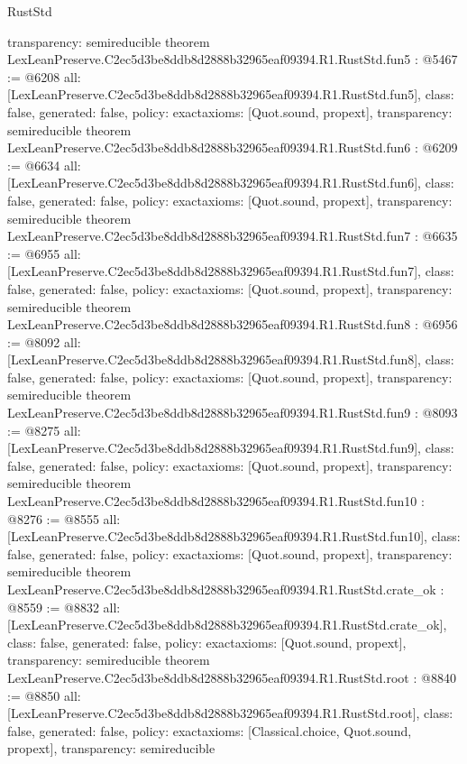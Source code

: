 \begin{lexlean}{RustStd}
\begin{coremodule}
{  transparency: semireducible
}
theorem LexLeanPreserve.C2ec5d3be8ddb8d2888b32965eaf09394.R1.RustStd.fun5 : @5467 := @6208 {
  all: [LexLeanPreserve.C2ec5d3be8ddb8d2888b32965eaf09394.R1.RustStd.fun5],
  class: false,
  generated: false,
  policy: exact{axioms: [Quot.sound, propext]},
  transparency: semireducible
}
theorem LexLeanPreserve.C2ec5d3be8ddb8d2888b32965eaf09394.R1.RustStd.fun6 : @6209 := @6634 {
  all: [LexLeanPreserve.C2ec5d3be8ddb8d2888b32965eaf09394.R1.RustStd.fun6],
  class: false,
  generated: false,
  policy: exact{axioms: [Quot.sound, propext]},
  transparency: semireducible
}
theorem LexLeanPreserve.C2ec5d3be8ddb8d2888b32965eaf09394.R1.RustStd.fun7 : @6635 := @6955 {
  all: [LexLeanPreserve.C2ec5d3be8ddb8d2888b32965eaf09394.R1.RustStd.fun7],
  class: false,
  generated: false,
  policy: exact{axioms: [Quot.sound, propext]},
  transparency: semireducible
}
theorem LexLeanPreserve.C2ec5d3be8ddb8d2888b32965eaf09394.R1.RustStd.fun8 : @6956 := @8092 {
  all: [LexLeanPreserve.C2ec5d3be8ddb8d2888b32965eaf09394.R1.RustStd.fun8],
  class: false,
  generated: false,
  policy: exact{axioms: [Quot.sound, propext]},
  transparency: semireducible
}
theorem LexLeanPreserve.C2ec5d3be8ddb8d2888b32965eaf09394.R1.RustStd.fun9 : @8093 := @8275 {
  all: [LexLeanPreserve.C2ec5d3be8ddb8d2888b32965eaf09394.R1.RustStd.fun9],
  class: false,
  generated: false,
  policy: exact{axioms: [Quot.sound, propext]},
  transparency: semireducible
}
theorem LexLeanPreserve.C2ec5d3be8ddb8d2888b32965eaf09394.R1.RustStd.fun10 : @8276 := @8555 {
  all: [LexLeanPreserve.C2ec5d3be8ddb8d2888b32965eaf09394.R1.RustStd.fun10],
  class: false,
  generated: false,
  policy: exact{axioms: [Quot.sound, propext]},
  transparency: semireducible
}
theorem LexLeanPreserve.C2ec5d3be8ddb8d2888b32965eaf09394.R1.RustStd.crate_ok : @8559 := @8832 {
  all: [LexLeanPreserve.C2ec5d3be8ddb8d2888b32965eaf09394.R1.RustStd.crate_ok],
  class: false,
  generated: false,
  policy: exact{axioms: [Quot.sound, propext]},
  transparency: semireducible
}
theorem LexLeanPreserve.C2ec5d3be8ddb8d2888b32965eaf09394.R1.RustStd.root : @8840 := @8850 {
  all: [LexLeanPreserve.C2ec5d3be8ddb8d2888b32965eaf09394.R1.RustStd.root],
  class: false,
  generated: false,
  policy: exact{axioms: [Classical.choice, Quot.sound, propext]},
  transparency: semireducible
}


\end{coremodule}
\end{lexlean}
